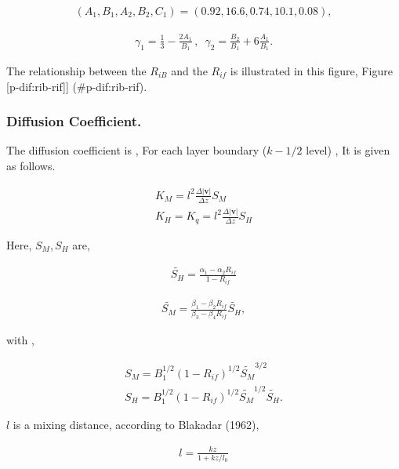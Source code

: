 \begin{eqnarray}
(A_1, B_1, A_2, B_2, C_1 ) = ( 0.92, 16.6, 0.74, 10.1, 0.08 ) ,
\end{eqnarray}

\begin{eqnarray}
\gamma_1 = \frac{1}{3} - \frac{2 A_1}{B_1}\, , \, \, \, 
\gamma_2 = \frac{B_2}{B_1} + 6\frac{A_1}{B_1} .
\end{eqnarray}

The relationship between the \(R_{iB}\) and the \(R_{if}\) is
illustrated in this figure, Figure {[}p-dif:rib-rif{]}{]}
(\#p-dif:rib-rif).

\hypertarget{diffusion-coefficient.}{%
\subsubsection{Diffusion Coefficient.}\label{diffusion-coefficient.}}

The diffusion coefficient is , For each layer boundary (\(k-1/2\) level)
, It is given as follows.

\begin{eqnarray}
K_M        =  l^2 \frac{\Delta |\mathbf{v}|}{\Delta z} S_M  \\
K_H = K_q  =  l^2 \frac{\Delta |\mathbf{v}|}{\Delta z} S_H 
\end{eqnarray}

Here, \(S_M, S_H\) are,

\begin{eqnarray}
\widetilde{S_H} = \frac{ \alpha_1-\alpha_2 R_{if} }{ 1-R_{if} }
\end{eqnarray}

\begin{eqnarray}
\widetilde{S_M} = \frac{ \beta_1-\beta_2 R_{if} }{ \beta_3-\beta_4 R_{if} } 
                  \widetilde{S_H} ,
\end{eqnarray}

with ,

\begin{eqnarray}
S_M  =  B_1^{1/2} ( 1- R_{if} )^{1/2} 
          \widetilde{S_M}^{3/2} \\
S_H  =  B_1^{1/2} ( 1- R_{if} )^{1/2} 
          \widetilde{S_M}^{1/2} \widetilde{S_H} .
\end{eqnarray}

\(l\) is a mixing distance, according to Blakadar (1962),

\begin{eqnarray}
l = \frac{kz}{1+kz/l_0}
\end{eqnarray}


